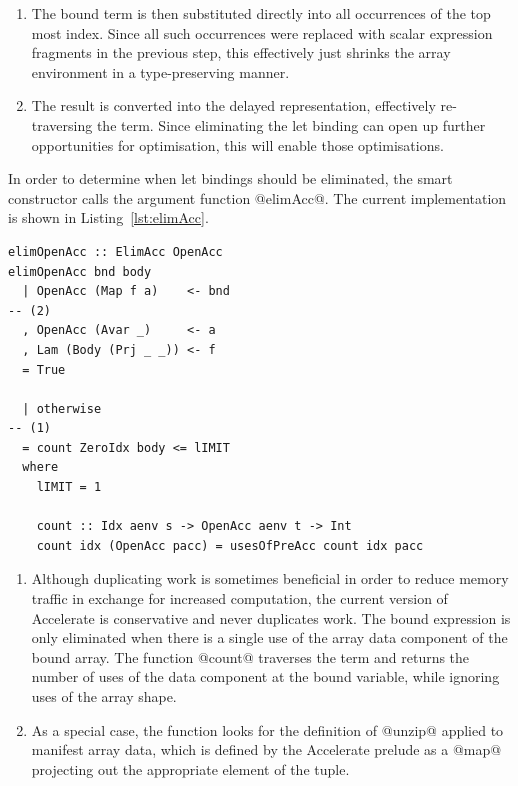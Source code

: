 \begin{enumerate}
\item The bound term is then substituted directly into all occurrences of the
    top most index. Since all such occurrences were replaced with scalar
    expression fragments in the previous step, this effectively just shrinks the
    array environment in a type-preserving manner.

\item The result is converted into the delayed representation, effectively
    re-traversing the term. Since eliminating the let binding can open up
    further opportunities for optimisation, this will enable those
    optimisations.


\end{enumerate}

In order to determine when let bindings should be eliminated, the smart
constructor calls the argument function @elimAcc@. The current implementation is
shown in Listing~\ref{lst:elimAcc}.

\begin{lstlisting}[style=haskell_float
    ,label=lst:elimAcc
    ,caption={Determining when a let binding should be eliminated}]
elimOpenAcc :: ElimAcc OpenAcc
elimOpenAcc bnd body
  | OpenAcc (Map f a)    <- bnd                                                        -- (2)
  , OpenAcc (Avar _)     <- a
  , Lam (Body (Prj _ _)) <- f
  = True

  | otherwise                                                                          -- (1)
  = count ZeroIdx body <= lIMIT
  where
    lIMIT = 1

    count :: Idx aenv s -> OpenAcc aenv t -> Int
    count idx (OpenAcc pacc) = usesOfPreAcc count idx pacc
\end{lstlisting}

\begin{enumerate}
\item Although duplicating work is sometimes beneficial in order to reduce
    memory traffic in exchange for increased computation, the current version of
    Accelerate is conservative and never duplicates work. The bound expression
    is only eliminated when there is a single use of the array data component of
    the bound array. The function @count@ traverses the term and returns the
    number of uses of the data component at the bound variable, while ignoring
    uses of the array shape.

\item As a special case, the function looks for the definition of @unzip@
    applied to manifest array data, which is defined by the Accelerate prelude
    as a @map@ projecting out the appropriate element of the tuple.

\end{enumerate}

